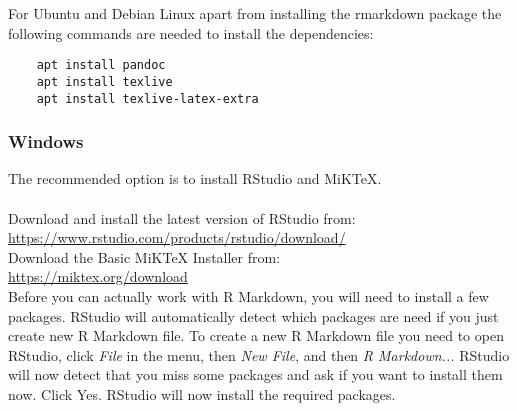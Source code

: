 For Ubuntu and Debian Linux apart from installing the rmarkdown package the following commands are needed to install the dependencies:

\begin{verbatim}
    apt install pandoc
    apt install texlive
    apt install texlive-latex-extra
\end{verbatim}

\subsubsection{Windows}

The recommended option is to install RStudio and MiKTeX.\\ \\
Download and install the latest version of RStudio from: \\
\url{https://www.rstudio.com/products/rstudio/download/} \\
Download the Basic MiKTeX Installer from: \\
\url{https://miktex.org/download} \\

Before you can actually work with R Markdown, you will need to install a few packages. RStudio will automatically detect which packages are need if you just create new R Markdown file. To create a new R Markdown file you need to open RStudio, click {\it File} in the menu, then {\it New File}, and then {\it R Markdown...} RStudio will now detect that you miss some packages and ask if you want to install them now. Click Yes. RStudio will now install the required packages.



